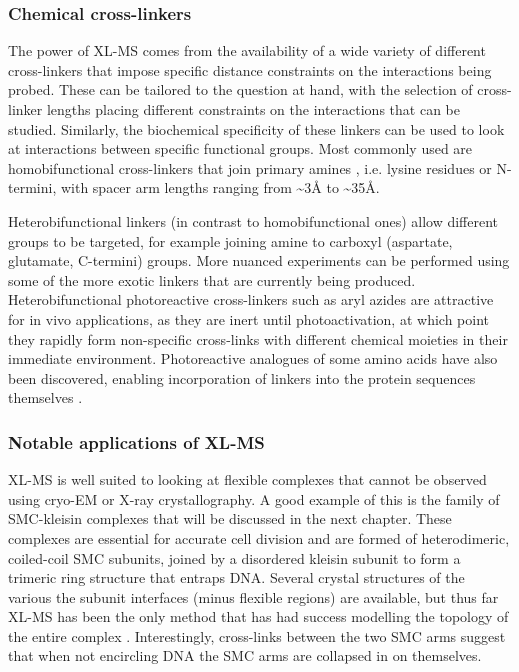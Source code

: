 \documentclass[a4paper,11pt,twoside,openright]{scrbook}
\begin{document}
\subsubsection{Chemical cross-linkers}
The power of XL-MS comes from the availability of a wide variety of different cross-linkers that impose specific distance constraints on the interactions being probed. These can be tailored to the question at hand, with the selection of cross-linker lengths placing different constraints on the interactions that can be studied. Similarly, the biochemical specificity of these linkers can be used to look at interactions between specific functional groups. Most commonly used are homobifunctional cross-linkers that join primary amines \cite{Leitner2016}, i.e. lysine residues or N-termini, with spacer arm lengths ranging from \textasciitilde 3Å to \textasciitilde 35Å.

Heterobifunctional linkers (in contrast to homobifunctional ones) allow different groups to be targeted, for example joining amine to carboxyl (aspartate, glutamate, C-termini) groups. More nuanced experiments can be performed using some of the more exotic linkers that are currently being produced. Heterobifunctional photoreactive cross-linkers such as aryl azides are attractive for in vivo applications, as they are inert until photoactivation, at which point they rapidly form non-specific cross-links with different chemical moieties in their immediate environment. Photoreactive analogues of some amino acids have also been discovered, enabling incorporation of linkers into the protein sequences themselves \cite{Suchanek2005}.


\subsubsection{Notable applications of XL-MS}
XL-MS is well suited to looking at flexible complexes that cannot be observed using cryo-EM or X-ray crystallography. A good example of this is the family of SMC-kleisin complexes that will be discussed in the next chapter. These complexes are essential for accurate cell division and are formed of heterodimeric, coiled-coil SMC subunits, joined by a disordered kleisin subunit to form a trimeric ring structure that entraps DNA. Several crystal structures of the various the subunit interfaces (minus flexible regions) are available, but thus far XL-MS has been the only method that has had success modelling the topology of the entire complex \cite{Barysz2015}. Interestingly, cross-links between the two SMC arms suggest that when not encircling DNA the SMC arms are collapsed in on themselves.
\end{document}
